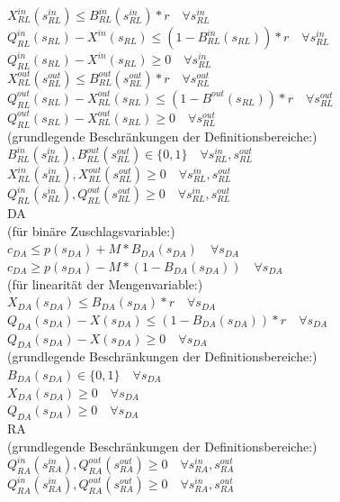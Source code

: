 \documentclass{article}
\begin{document}
        $X^{in}_{RL}(s^{in}_{RL}) \leq B^{in}_{RL}(s^{in}_{RL}) * r \quad\forall s^{in}_{RL}$\\
        $Q^{in}_{RL}(s_{RL}) - X^{in}(s_{RL}) \leq (1 - B^{in}_{RL}(s_{RL})) * r \quad\forall s^{in}_{RL}$\\
        $Q^{in}_{RL}(s_{RL}) - X^{in}(s_{RL}) \geq 0 \quad\forall s^{in}_{RL}$\\
        $X^{out}_{RL}(s^{out}_{RL}) \leq B^{out}_{RL}(s^{out}_{RL}) * r \quad\forall s^{out}_{RL}$\\
        $Q^{out}_{RL}(s_{RL}) - X^{out}_{RL}(s_{RL}) \leq (1 - B^{out}(s_{RL})) * r \quad\forall s^{out}_{RL}$\\
        $Q^{out}_{RL}(s_{RL}) - X^{out}_{RL}(s_{RL}) \geq 0\quad\forall s^{out}_{RL} $\\
        (grundlegende Beschränkungen der Definitionsbereiche:)\\
        $B^{in}_{RL}(s^{in}_{RL}),B^{out}_{RL}(s^{out}_{RL}) \in \{0,1\}\quad\forall s^{in}_{RL},s^{out}_{RL} $\\
        $X^{in}_{RL}(s^{in}_{RL}),X^{out}_{RL}(s^{out}_{RL}) \geq 0 \quad\forall s^{in}_{RL},s^{out}_{RL} $\\
        $Q^{in}_{RL}(s^{in}_{RL}),Q^{out}_{RL}(s^{out}_{RL}) \geq 0\quad\forall  s^{in}_{RL},s^{out}_{RL} $\\
DA\\
        (für binäre Zuschlagsvariable:)\\
        $c_{DA} \leq p(s_{DA}) + M * B_{DA}(s_{DA})\quad\forall s_{DA} $ \\
        $c_{DA} \geq p(s_{DA}) - M * (1 - B_{DA}(s_{DA}))\quad\forall s_{DA} $ \\
        (für linearität der Mengenvariable:)\\
        $X_{DA}(s_{DA}) \leq B_{DA}(s_{DA}) * r \quad\forall s_{DA}$\\
        $Q_{DA}(s_{DA}) - X(s_{DA}) \leq (1 - B_{DA}(s_{DA})) * r \quad\forall s_{DA}$\\
        $Q_{DA}(s_{DA}) - X(s_{DA}) \geq 0 \quad\forall s_{DA}$\\
        (grundlegende Beschränkungen der Definitionsbereiche:)\\
        $B_{DA}(s_{DA})\in \{0,1\}\quad\forall s_{DA} $\\
        $X_{DA}(s_{DA}) \geq 0 \quad\forall s_{DA} $\\
        $Q_{DA}(s_{DA}) \geq 0\quad\forall  s_{DA} $\\
RA\\
	(grundlegende Beschränkungen der Definitionsbereiche:)
	$Q^{in}_{RA}(s^{in}_{RA}),Q^{out}_{RA}(s^{out}_{RA}) \geq 0 \quad\forall s^{in}_{RA},s^{out}_{RA} $\\
	$Q^{in}_{RA}(s^{in}_{RA}),Q^{out}_{RA}(s^{out}_{RA}) \geq 0\quad\forall  s^{in}_{RA},s^{out}_{RA} $\\
\end{document}
